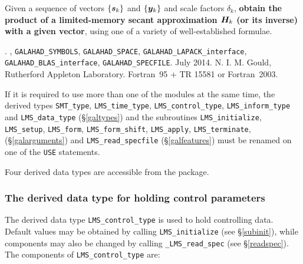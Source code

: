 \documentclass{galahad}
\newcommand{\packagename}{LMS}
\newcommand{\fullpackagename}{\libraryname\_\packagename}
\begin{document}
\galheader


\galsummary
Given a sequence of vectors $\{{\bm{s}}_k\}$ and $\{{\bm{y}}_k\}$ and scale factors
$\delta_k$, {\bf obtain the product of a limited-memory secant approximation
${\bm{H}}_k$ (or its inverse) with a given vector}, using one of a variety of
well-established formulae.


\galattributes
\galversions{\tt  \fullpackagename\_single, \fullpackagename\_double}.
,
{\tt GALAHAD\_\-SY\-M\-BOLS},
{\tt GALAHAD\-\_SPACE},
{\tt GALAHAD\_LAPACK\_interface},
{\tt GALAHAD\_BLAS\_interface},
{\tt GALAHAD\_SPECFILE}.
\galdate July 2014.
\galorigin N. I. M. Gould,
Rutherford Appleton Laboratory.
\gallanguage Fortran~95 + TR 15581 or Fortran~2003.


\galhowto



\noindent
If it is required to use more than one of the modules at the same time, 
the derived types
{\tt SMT\_type},
{\tt \packagename\_time\_type},
{\tt \packagename\_control\_type},
{\tt \packagename\_inform\_type}
and
{\tt \packagename\_data\_type}
(\S\ref{galtypes})
and the subroutines
{\tt \packagename\_initialize},
{\tt \packagename\_\-setup},
{\tt \packagename\_\-form},
{\tt \packagename\_\-form\_shift},
{\tt \packagename\_\-apply},
{\tt \packagename\_terminate},
(\S\ref{galarguments})
and
{\tt \packagename\_read\_specfile}
(\S\ref{galfeatures})
must be renamed on one of the {\tt USE} statements.





%


\galtypes
Four derived data types are accessible from the package.


\subsubsection{The derived data type for holding control
 parameters}\label{typecontrol}
The derived data type
{\tt \packagename\_control\_type}
is used to hold controlling data. Default values may be obtained by calling
{\tt \packagename\_initialize}
(see \S\ref{subinit}),
while components may also be changed by calling
{\tt \fullpackagename\_read\-\_spec}
(see \S\ref{readspec}).
The components of
{\tt \packagename\_control\_type}
are:
\end{document}
